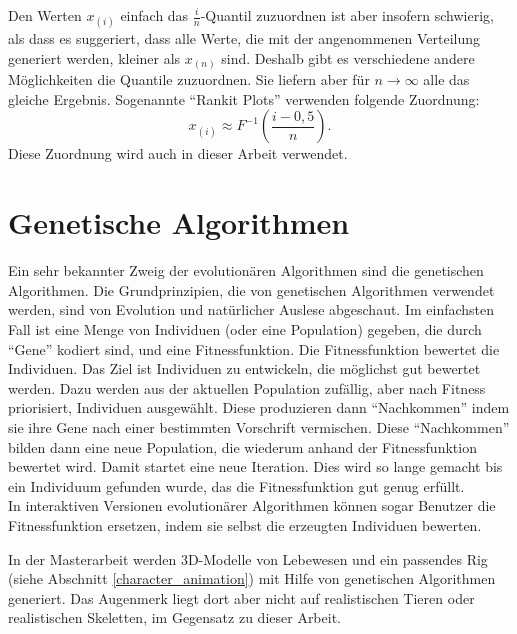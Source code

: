 Den Werten $x_{(i)}$ einfach das $\frac{i}{n}$-Quantil zuzuordnen ist aber insofern schwierig, als dass es suggeriert, dass alle Werte, die mit der angenommenen Verteilung generiert werden, kleiner als $x_{(n)}$ sind. Deshalb gibt es verschiedene andere Möglichkeiten die Quantile zuzuordnen. Sie liefern aber für $n \rightarrow \infty$ alle das gleiche Ergebnis. Sogenannte "`Rankit Plots"' verwenden folgende Zuordnung:
\[ x_{(i)} \approx F^{-1}\left(\frac{i - 0{,}5}{n}\right). \]
Diese Zuordnung wird auch in dieser Arbeit verwendet.


\section{Genetische Algorithmen}
\label{genetic_algorithms}

Ein sehr bekannter Zweig der evolutionären Algorithmen sind die genetischen Algorithmen.
Die Grundprinzipien, die von genetischen Algorithmen verwendet werden, sind von Evolution und natürlicher Auslese abgeschaut. Im einfachsten Fall ist eine Menge von Individuen (oder eine Population) gegeben, die durch "`Gene"' kodiert sind, und eine Fitnessfunktion. Die Fitnessfunktion bewertet die Individuen. Das Ziel ist Individuen zu entwickeln, die möglichst gut bewertet werden. 
Dazu werden aus der aktuellen Population zufällig, aber nach Fitness priorisiert, Individuen ausgewählt. Diese produzieren dann "`Nachkommen"' indem sie ihre Gene nach einer bestimmten Vorschrift vermischen.
Diese "`Nachkommen"' bilden dann eine neue Population, die wiederum anhand der Fitnessfunktion bewertet wird. Damit startet eine neue Iteration.
Dies wird so lange gemacht bis ein Individuum gefunden wurde, das die Fitnessfunktion gut genug erfüllt. \cite{Holland} \cite[Abschnitt 1.3.1]{EvolutionaryDesign_Introduction}\\
In interaktiven Versionen evolutionärer Algorithmen können sogar Benutzer die Fitnessfunktion ersetzen, indem sie selbst die erzeugten Individuen bewerten. \cite{InteractiveEvolutionaryComputation}

In der Masterarbeit \cite{JonHudson} werden 3D-Modelle von Lebewesen und ein passendes Rig (siehe Abschnitt \ref{character_animation}) mit Hilfe von genetischen Algorithmen generiert. Das Augenmerk liegt dort aber nicht auf realistischen Tieren oder realistischen Skeletten, im Gegensatz zu dieser Arbeit.
